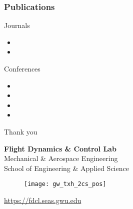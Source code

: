 \begin{frame}[t]\frametitle{Publications}

{\scriptsize
Journals
    \begin{itemize}
        \item {}
        \item {}
    \end{itemize}

Conferences

\begin{itemize}
    \item {}
    \item {}
    \item {}
    \item {}
\end{itemize}
}
\end{frame}

\begin{frame}[c]{Thank you}
  \centering
  
  \textbf{\large Flight Dynamics \& Control Lab} \\
  Mechanical \& Aerospace Engineering \\
  School of Engineering \& Applied Science
  
  \begin{figure} %
        \texttt{[image: gw\_txh\_2cs\_pos]}
    \end{figure}
  
  \url{https://fdcl.seas.gwu.edu}
\end{frame}